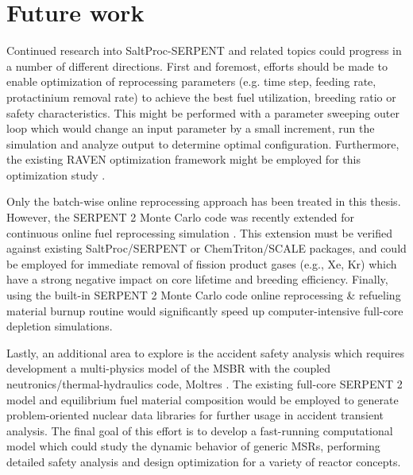 \section{Future work}
Continued research into SaltProc-SERPENT and related topics could progress in a number of different directions. First and foremost, efforts should be made to enable optimization of reprocessing parameters (e.g. time step, feeding rate, protactinium removal rate) to achieve the best fuel utilization, breeding ratio or safety characteristics. This might be performed with a parameter sweeping outer loop which would change an input parameter by a small increment, run the simulation and analyze output to determine optimal configuration. Furthermore, the existing RAVEN optimization framework might be employed for this optimization study \cite{alfonsi_raven_2013}.

Only the batch-wise online reprocessing approach has been treated in this thesis. However, the SERPENT 2 Monte Carlo code was recently extended for continuous online fuel reprocessing simulation \cite{aufiero_extended_2013}. This extension must be verified against existing SaltProc/SERPENT or ChemTriton/SCALE packages, and could be employed for immediate removal of fission product gases (e.g., Xe, Kr) which have a strong negative impact on core lifetime and breeding efficiency. Finally, using the built-in SERPENT 2 Monte Carlo code online reprocessing \& refueling material burnup routine would significantly speed up computer-intensive full-core depletion simulations.

Lastly, an additional area to explore is the accident safety analysis which requires development a multi-physics model of the \gls{MSBR} with the coupled neutronics/thermal-hydraulics code, Moltres \cite{lindsay_introduction_2018}. The existing full-core SERPENT 2 model and equilibrium fuel material composition would be employed to generate problem-oriented nuclear data libraries for further usage in accident transient analysis. The final goal of this effort is to develop a fast-running computational model which could study the dynamic behavior of generic \glspl{MSR}, performing detailed safety analysis and design optimization for a variety of reactor concepts.


